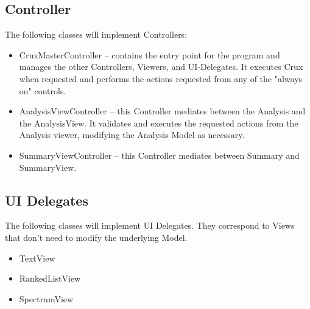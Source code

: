 \documentclass{article}
\begin{document}
\subsection{Controller}

The following classes will implement Controllers:

\begin{itemize}
\item CruxMasterController -- contains the entry
point for the program and manages the other Controllers, Viewers, and UI-Delegates.
It executes Crux when requested and performs the actions requested from any of 
the "always on" controls.
\item AnalysisViewController -- this Controller mediates between
the Analysis and the AnalysisView. It validates and executes the 
requested actions from the Analysis viewer, modifying the Analysis Model
as necessary.
\item SummaryViewController -- this Controller mediates between
Summary and SummaryView.
\end{itemize}

\subsection{UI Delegates}

The following classes will implement UI Delegates. They correspond to Views
that don't need to modify the underlying Model.

\begin{itemize}
\item TextView 
\item RankedListView
\item SpectrumView
\end{itemize}
\end{document}
